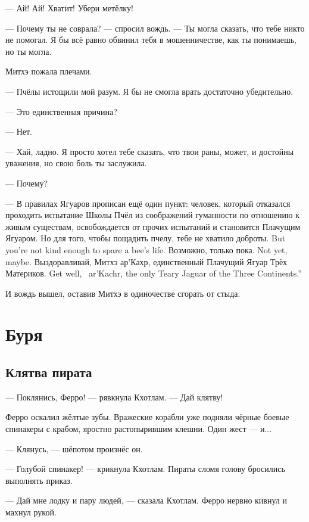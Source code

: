 --- Ай!
Ай!
Хватит!
Убери метёлку!

\textspace

--- Почему ты не соврала? --- спросил вождь.
--- Ты могла сказать, что тебе никто не помогал.
Я бы всё равно обвинил тебя в мошенничестве, как ты понимаешь, но ты могла.

Митхэ пожала плечами.

--- Пчёлы истощили мой разум.
Я бы не смогла врать достаточно убедительно.

--- Это единственная причина?

--- Нет.

--- Хай, ладно.
Я просто хотел тебе сказать, что твои раны, может, и достойны уважения, но свою боль ты заслужила.

--- Почему?

--- В правилах Ягуаров прописан ещё один пункт: человек, который отказался проходить испытание Школы Пчёл из соображений гуманности по отношению к живым существам, освобождается от прочих испытаний и становится Плачущим Ягуаром.
{Но для того, чтобы пощадить пчелу, тебе не хватило доброты.}
{But you're not kind enough to spare a bee's life.}
{Возможно, только пока.}
{Not yet, maybe.}
{Выздоравливай, Митхэ ар'Кахр, единственный Плачущий Ягуар Трёх Материков.}
{Get well, \Mitchoe\ ar'Kachr, the only Teary Jaguar of the Three Continents.''}

И вождь вышел, оставив Митхэ в одиночестве сгорать от стыда.

\chapter{Буря}

\section{Клятва пирата}

--- Поклянись, Ферро! --- рявкнула Кхотлам.
--- Дай клятву!

Ферро оскалил жёлтые зубы.
Вражеские корабли уже подняли чёрные боевые спинакеры с крабом, яростно растопырившим клешни.
Один жест --- и...

--- Клянусь, --- шёпотом произнёс он.

--- Голубой спинакер! --- крикнула Кхотлам.
Пираты сломя голову бросились выполнять приказ.

--- Дай мне лодку и пару людей, --- сказала Кхотлам.
Ферро нервно кивнул и махнул рукой.

